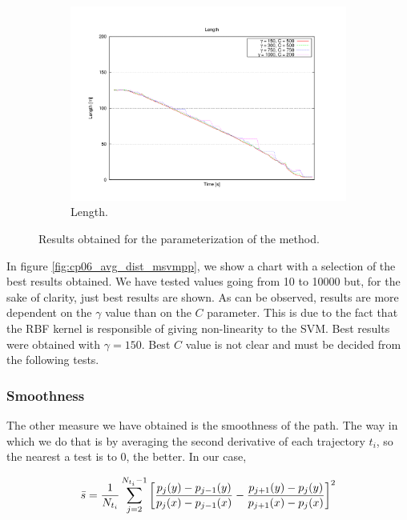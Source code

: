 \begin{figure}[h!]
  \ContinuedFloat
  \begin{subfigure}[b]{\textwidth}
	  \centering
	  \includegraphics[width=\textwidth,height=0.5\textwidth, trim=55 50 85 60,clip]{figure10}
	  \caption{Length.}
	  \label{fig:cp06_length_msvmpp}
  \end{subfigure}
  
  \caption{Results obtained for the parameterization of the method.}\label{fig:cp06_results_parameterization}
\end{figure}

In figure \ref{fig:cp06_avg_dist_msvmpp}, we show a chart with a selection of the best results obtained. We have tested values going from 10 to 10000 but, for the sake of clarity, just best results are shown. As can be observed, results are more dependent on the $\gamma$ value than on the $C$ parameter. This is due to the fact that the \ac{RBF} kernel is responsible of giving non-linearity to the \ac{SVM}. Best results were obtained with $\gamma = 150$. Best $C$ value is not clear and must be decided from the following tests.

\subsubsection{Smoothness}\label{ch:chapter06_02_01_02}

The other measure we have obtained is the smoothness of the path. The way in which we do that is by averaging the second derivative of each trajectory $t_i$, so the nearest a test is to $0$, the better. In our case,

\begin{equation}\label{eq:cp06_avg_smooth}
  \bar{s} = {1 \over N_{t_i}} \sum_{j=2}^{N_{t_i} - 1} \left[ {{p_j(y) - p_{j-1}(y)} \over {p_j(x) - p_{j-1}(x)}} - {{p_{j + 1}(y) - p_j(y)} \over {p_{j + 1}(x) - p_j(x)}} \right]^2
\end{equation}

